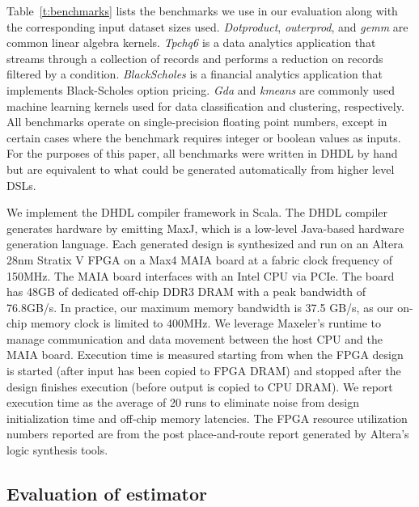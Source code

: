 Table~\ref{t:benchmarks} lists the benchmarks we use in our evaluation along with the corresponding
input dataset sizes used. \emph{Dotproduct}, \emph{outerprod}, and \emph{gemm} are common
linear algebra kernels. \emph{Tpchq6} is a data analytics application that streams through a collection
of records and performs a reduction on records filtered by a condition. \emph{BlackScholes} is
a financial analytics application that implements Black-Scholes option pricing. \emph{Gda}
and \emph{kmeans}
are commonly used machine learning kernels used for data classification and clustering, respectively.
All benchmarks operate on single-precision floating point numbers,
except in certain cases where the benchmark requires integer or boolean values as inputs.
For the purposes of this paper, all benchmarks were written in DHDL by hand but are equivalent to what
could be generated automatically from higher level DSLs.

We implement the DHDL compiler framework in Scala. The DHDL compiler generates hardware by emitting
MaxJ, which is a low-level Java-based hardware generation language. Each generated design is synthesized
and run on an Altera 28nm Stratix V FPGA on a Max4 MAIA board at a fabric clock frequency of 150MHz.
The MAIA board interfaces with an Intel CPU
via PCIe. The board has 48GB of dedicated off-chip DDR3 DRAM with a peak bandwidth of 76.8GB/s. In practice,
our maximum memory bandwidth is 37.5 GB/s, as our on-chip memory clock is limited to 400MHz.
We leverage Maxeler's runtime to manage communication and data movement between the host CPU and
the MAIA board.
Execution time is measured starting
from when the FPGA design is started (after input has been copied to FPGA DRAM) and stopped after
the design finishes execution (before output is copied to CPU DRAM). We report execution time as the
average of 20 runs to eliminate noise from design initialization time and off-chip memory latencies.
The FPGA resource utilization
numbers reported are from the post place-and-route report generated by Altera's logic synthesis tools.

\subsection{Evaluation of estimator}


